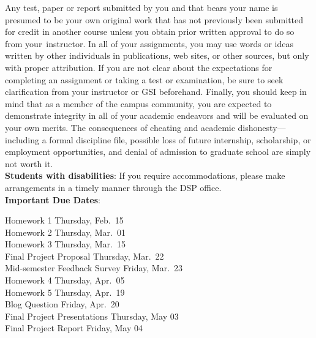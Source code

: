 \documentclass[11pt]{article}
\begin{document}
Any test, paper or report submitted by you and that bears your name is presumed
to be your own original work that has not previously been submitted for credit
in another course unless you obtain prior written approval to do so from
your instructor. In all of your assignments, you may use words or ideas written
by other individuals in publications, web sites, or other sources, but only with
proper attribution. If you are not clear about the expectations for completing
an assignment or taking a test or examination, be sure to seek clarification
from your instructor or GSI beforehand. Finally, you should keep in mind that as
a member of the campus community, you are expected to demonstrate integrity in
all of your academic endeavors and will be evaluated on your own merits. The
consequences of cheating and academic dishonesty—including a formal discipline
file, possible loss of future internship, scholarship, or employment
opportunities, and denial of admission to graduate school are simply not worth
it. \\

\textbf{Students with disabilities}: If you require accommodations, please make
arrangements in a timely manner through the DSP office.\\

\noindent\textbf{Important Due Dates}:
\begin{center} \begin{minipage}{5in}
\begin{flushleft}
Homework 1 \dotfill Thursday, Feb.~15\\
Homework 2 \dotfill Thursday, Mar.~01\\
Homework 3 \dotfill Thursday, Mar.~15\\
Final Project Proposal \dotfill Thursday, Mar.~22\\
Mid-semester Feedback Survey \dotfill Friday, Mar.~23\\
Homework 4 \dotfill Thursday, Apr.~05\\
Homework 5 \dotfill Thursday, Apr.~19\\
Blog Question \dotfill Friday, Apr.~20\\
Final Project Presentations \dotfill Thursday, May 03\\
Final Project Report \dotfill Friday, May 04\\
\end{flushleft}
\end{minipage}
\end{center}

\newpage
\end{document}

